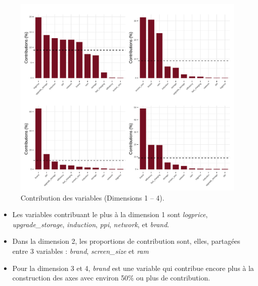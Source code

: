 \documentclass[
  12pt,
]{report}
\begin{document}
\begin{figure}[H]

{\centering \includegraphics{report_files/figure-pdf/unnamed-chunk-15-1.pdf}

}

\caption{Contribution des variables (Dimensions 1 -- 4).}

\end{figure}%

\begin{itemize}
\item
  Les variables contribuant le plus à la dimension 1 sont
  \emph{logprice}, \emph{upgrade\_storage}, \emph{induction},
  \emph{ppi}, \emph{network}, et \emph{brand}.
\item
  Dans la dimension 2, les proportions de contribution sont, elles,
  partagées entre 3 variables : \emph{brand}, \emph{screen\_size} et
  \emph{ram}
\item
  Pour la dimension 3 et 4, \emph{brand} est une variable qui contribue
  encore plus à la construction des axes avec environ 50\% ou plus de
  contribution.
\end{itemize}
\end{document}
